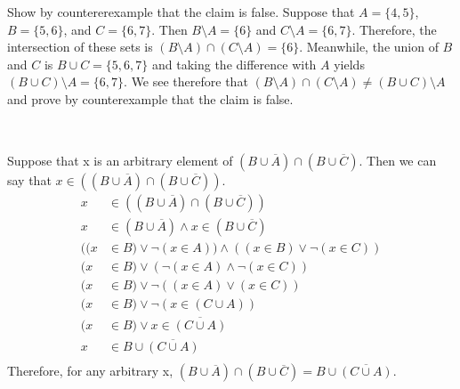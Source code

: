 \documentclass[11pt]{article}
\makeatletter
\def\ol{\overline}
\def\sm{\setminus}
\renewenvironment{proof}[1][\proofname]{\par
  \normalfont \topsep6\p@\@plus6\p@\relax
  \trivlist
  \item[\hskip\labelsep
        \itshape
    #1\@addpunct{.}]\ignorespaces
}{%
  \endtrivlist\@endpefalse
}
\makeatother
\begin{document}
\subsection{} %
\begin{proof}[\textbf{Disprove:} $(B \sm A) \cap (C \sm A) = (B \cup C) \sm A$] \leavevmode \\
	Show by countererexample that the claim is false. Suppose that $A = \{4, 5\}$, $B = \{5, 6\}$, and $C = \{6, 7\}$. Then $B \sm A = \{6\}$ and $C \sm A = \{6, 7\}$. Therefore, the intersection of these sets is $(B \sm A) \cap (C \sm A) = \{6\}$. Meanwhile, the union of $B$ and $C$ is $B \cup C = \{5, 6, 7\}$ and taking the difference with $A$ yields $(B \cup C) \sm A = \{6, 7\}$. We see therefore that $(B \sm A) \cap (C \sm A) \neq (B \cup C) \sm A$ and prove by counterexample that the claim is false. 
\end{proof}

\subsection{} %
\begin{proof}[\textbf{Prove:} $(B \cup \ol A) \cap (B \cup \ol C) = B \cup \ol{(C \cup A)}$] \leavevmode \\
	Suppose that x is an arbitrary element of $(B \cup \ol A) \cap (B \cup \ol C)$. Then we can say that $x \in ((B \cup \ol A) \cap (B \cup \ol C))$. 
	\begin{align*}
		x &\in ((B \cup \ol A) \cap (B \cup \ol C)) \\
		x &\in (B \cup \ol A) \land x \in (B \cup \ol C) \tag*{Definition of Intersection} \\
		((x &\in B) \lor \neg (x \in A)) \land ((x \in B) \lor \neg (x \in C)) \tag*{Definition of Union x2} \\
		(x &\in B) \lor (\neg (x \in A) \land \neg (x \in C)) \tag*{Distribution} \\
		(x &\in B) \lor \neg ((x \in A) \lor (x \in C)) \tag*{De Morgan's} \\
		(x &\in B) \lor \neg (x \in (C \cup A)) \tag*{Definition of Union} \\
		(x &\in B) \lor x \in \ol{(C \cup A)} \tag*{Definition of Complement} \\
		x &\in B \cup \ol{(C \cup A)} \tag*{Definition of Union} \\
	\end{align*}
	Therefore, for any arbitrary x, $(B \cup \ol A) \cap (B \cup \ol C) = B \cup \ol{(C \cup A)}$.
\end{proof}
\end{document}
